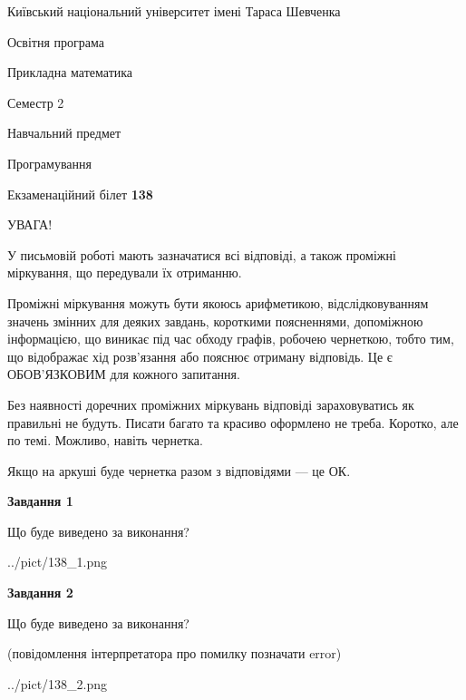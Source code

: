 \documentclass[12pt, ukrainian]{article}
\begin{document}
{{\begin {small}\par
{ \center  Київський національний університет імені Тараса Шевченка \par}
{\parbox {5 cm}{Освітня програма \hfill}{\parbox {7 cm}{Прикладна математика\hfill}}\parbox {6 cm}{\hfill Семестр 2}}\par
{\parbox {5 cm} {Навчальний предмет \hfill}\parbox {7 cm}{Програмування \hfill}\parbox {6cm}{\hfill}\par}\vspace{-7pt} \end{small}}{\center Екзаменаційний білет \No \textbf
{ 138 }\par}}
{
\begin {large}
УВАГА!

У письмовій роботі мають зазначатися всі відповіді, а також проміжні міркування, що передували їх отриманню.

Проміжні міркування можуть бути якоюсь арифметикою, відслідковуванням зна\-чень змінних для деяких завдань,
короткими поясненнями, допоміжною інформацією, що виникає під час обходу графів, робочею чернеткою,
тобто тим, що відображає хід розв’язання або пояснює отриману відповідь.
Це є ОБОВ’ЯЗКОВИМ для кожного запитання.

Без наявності доречних проміжних міркувань відповіді зараховуватись як правиль\-ні не будуть.
Писати багато та красиво оформлено не треба. Коротко, але по темі. Можли\-во, навіть чернетка.

Якщо на аркуші буде чернетка разом з відповідями --- це ОК.

\newpage

{\begin {center}\textbf{Завдання 1}\end {center}}\par
Що буде виведено за виконання?\par
\begin{center}
	{../pict/138_1.png}
\end{center}
\newpage

{\begin {center}\textbf{Завдання 2}\end {center}}\par
Що буде виведено за виконання?\par
 (повідомлення інтерпретатора про помилку позначати error)\par
\begin{center}
	{../pict/138_2.png}
\end{center}
\newpage


\end{large}}
\end{document}
